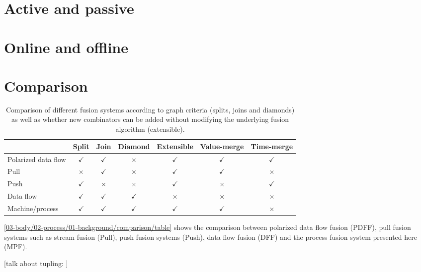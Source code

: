 \section{Active and passive}

\section{Online and offline}

\section{Comparison}

\begin{table}
\begin{center}
\begin{tabular}{|l||c|c|c|c|c|c|}
\hline
 & Split & Join & Diamond & Extensible & Value-merge & Time-merge \\
\hline
\hline
Polarized data flow
  & $\checkmark$ & $\checkmark$ & $\times$ & $\checkmark$ & $\checkmark$& $\checkmark$ \\
Pull
  & $\times$ & $\checkmark$ & $\times$ & $\checkmark$ & $\checkmark$ & $\times$ \\
Push
  & $\checkmark$ & $\times$ & $\times$ & $\checkmark$ & $\times$ & $\checkmark$ \\
Data flow
  & $\checkmark$ & $\checkmark$ & $\checkmark$ & $\times$ & $\times$ & $\times$ \\
Machine/process
  & $\checkmark$ & $\checkmark$ & $\checkmark$ & $\checkmark$ & $\checkmark$ & $\times$ \\
\hline
\end{tabular}
\end{center}
\caption[Comparison between fusion systems]{Comparison of different fusion systems according to graph criteria (splits, joins and diamonds) as well as whether new combinators can be added without modifying the underlying fusion algorithm (extensible).}
\label{03-body/02-process/01-background/comparison/table}
\end{table}

\autoref{03-body/02-process/01-background/comparison/table} shows the comparison between polarized data flow fusion (PDFF), pull fusion systems such as stream fusion (Pull), push fusion systems (Push), data flow fusion (DFF) and the process fusion system presented here (MPF).

[talk about tupling: \cite{hu1996deriving,hu1996cheap,hu1996extension,hu1997tupling,hu2005program,bransen2014exploiting,chiba2010program,launchbury1995warm}]

